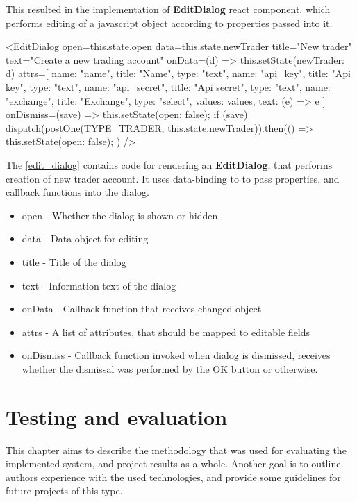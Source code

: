 This resulted in the implementation of \textbf{EditDialog} react component, which performs editing of a javascript object according
to properties passed into it.

\begin{code}[language=html,label={edit_dialog},caption={EditDialog for creation of Trader account}]
<EditDialog
    open={this.state.open}
    data={this.state.newTrader}
    title="New trader"
    text="Create a new trading account"
    onData={(d) => {
        this.setState({newTrader: d})
    }}
    attrs={[
        {name: "name", title: "Name", type: "text"},
        {name: "api_key", title: "Api key", type: "text"},
        {name: "api_secret", title: "Api secret", type: "text"},
        {name: "exchange", title: "Exchange", type: "select", values: values, text: (e) => e}
    ]}
    onDismiss={(save) => {
        this.setState({open: false});
        if (save) {
            dispatch(postOne(TYPE_TRADER, this.state.newTrader)).then(() => {
                this.setState({open: false});
            })
        }
    }}
/>
\end{code}

The \autoref{edit_dialog} contains code for rendering an \textbf{EditDialog}, that performs creation of new trader
account. It uses data-binding to to pass properties, and callback functions into the dialog.
\begin{itemize}
    \item {open -} Whether the dialog is shown or hidden
    \item {data - } Data object for editing
    \item {title - } Title of the dialog
    \item {text - } Information text of the dialog
    \item {onData - } Callback function that receives changed object
    \item {attrs - } A list of attributes, that should be mapped to editable fields
    \item {onDismiss - } Callback function invoked when dialog is dismissed, receives whether the dismissal was performed
    by the OK button or otherwise.
\end{itemize}


\chapter{Testing and evaluation}
This chapter aims to describe the methodology that was used for evaluating the implemented system, and project results
as a whole. Another goal is to outline authors experience with the used technologies, and provide some guidelines for future
projects of this type.

